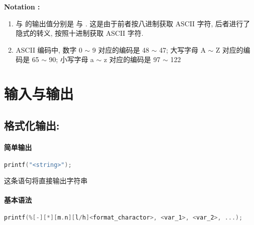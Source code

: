         \textbf{Notation :}
            \begin{enumerate}
                \item {} 与  的输出值分别是  与 . 这是由于前者按八进制获取 ASCII 字符, 后者进行了隐式的转义, 按照十进制获取 ASCII 字符.
                \item ASCII 编码中, 数字 0 $\sim$ 9 对应的编码是 48 $\sim$ 47; 大写字母 A $\sim$ Z 对应的编码是 65 $\sim$ 90; 小写字母 a $\sim$ z 对应的编码是 97 $\sim$ 122
            \end{enumerate}

\section{输入与输出}
    \subsection{格式化输出: }
        \paragraph{简单输出}
            \begin{lstlisting}[language = {C}, gobble = 16]
                printf("<string>");
            \end{lstlisting}
            这条语句将直接输出字符串 


        \paragraph{基本语法}
            \begin{lstlisting}[language = {C}, gobble = 16]
                printf(%[-][*][m.n][l/h]<format_charactor>, <var_1>, <var_2>, ...);
            \end{lstlisting}

